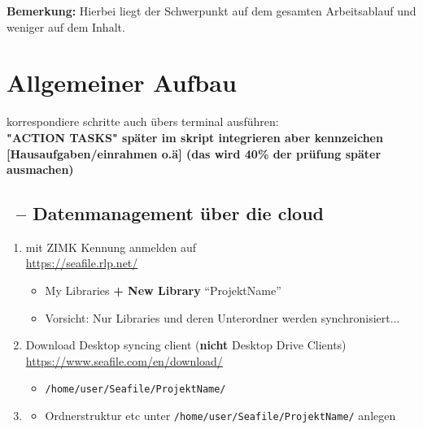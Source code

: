 	\textbf{Bemerkung:} Hierbei liegt der Schwerpunkt auf dem gesamten Arbeitsablauf und weniger auf dem Inhalt.


\section{Allgemeiner Aufbau}
korrespondiere schritte auch übers terminal ausführen:\\

\textbf{\color{red} "ACTION TASKS" später im skript integrieren aber kennzeichen [Hausaufgaben/einrahmen o.ä] (das wird 40\% der prüfung später ausmachen)}
\subsection{\seafile~-- Datenmanagement über die cloud}
\begin{enumerate}
	\item mit ZIMK Kennung anmelden auf\\
	\url{https://seafile.rlp.net/}
	\begin{itemize}
		\item My Libraries \textbf{+ New Library} ``ProjektName''
		\item {\color{red}Vorsicht:} Nur Libraries und deren Unterordner werden synchronisiert...
	\end{itemize}
	\item Download Desktop syncing client (\textbf{nicht} Desktop Drive Clients)\\
	\url{https://www.seafile.com/en/download/}
	\begin{itemize}
		\item \texttt{/home/user/Seafile/ProjektName/}
	\end{itemize}
	\item \textbf{\filemanager}
	\begin{itemize}
		\item Ordnerstruktur etc unter \texttt{/home/user/Seafile/ProjektName/} anlegen
	\end{itemize}
\end{enumerate}


